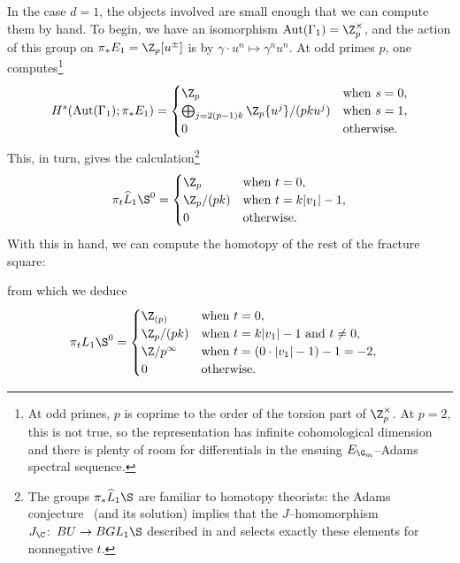 \begin{example}\label{piLK1SExample}
In the case \(d = 1\), the objects involved are small enough that we can compute them by hand.  To begin, we have an isomorphism \(\operatorname{Aut}(\Gamma_1) = \Z_p^\times\), and the action of this group on \(\pi_* E_1 = \Z_p[u^\pm]\) is by \(\gamma \cdot u^n \mapsto \gamma^n u^n\).  At odd primes \(p\), one computes\footnote{At odd primes, \(p\) is coprime to the order of the torsion part of \(\Z_p^\times\).  At \(p = 2\), this is not true, so the representation has infinite cohomological dimension and there is plenty of room for differentials in the ensuing \(E_{\G_m}\)--Adams spectral sequence.} \[H^s(\operatorname{Aut}(\Gamma_1); \pi_* E_1) = \begin{cases}\Z_p & \text{when \(s = 0\)}, \\ \bigoplus_{j = 2(p-1)k} \Z_p\{u^j\} / (pk u^j) & \text{when \(s = 1\)}, \\ 0 & \text{otherwise}. \end{cases}\]  This, in turn, gives the calculation\footnote{The groups \(\pi_* \widehat L_1 \S\) are familiar to homotopy theorists: the Adams conjecture~\cite{AdamsJXIV} (and its solution) implies that the \(J\)--homomorphism \(J_{\C}\co BU \to BGL_1 \S\) described in  and  selects exactly these elements for nonnegative \(t\).}
\[
\pi_t \widehat L_1 \S^0 = \begin{cases} \Z_p & \text{when \(t = 0\)}, \\ \Z_p / (pk) & \text{when \(t = k|v_1| - 1\)}, \\ 0 & \text{otherwise}. \end{cases}
\]
With this in hand, we can compute the homotopy of the rest of the fracture square:
\begin{center}
\end{center}
from which we deduce
\begin{align*}
\pi_t L_1 \S^0 & = \begin{cases} \Z_{(p)} & \text{when \(t = 0\)}, \\ \Z_p / (pk) & \text{when \(t = k|v_1| - 1\) and \(t \ne 0\)}, \\ \Z/p^\infty & \text{when \(t = (0 \cdot |v_1| - 1) - 1 = -2\)}, \\ 0 & \text{otherwise}. \end{cases}
\end{align*}
\end{example}


